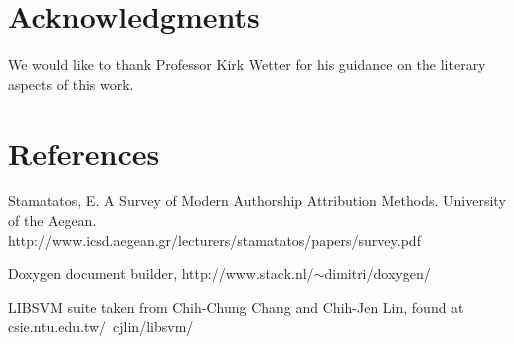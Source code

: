 \documentclass[11pt,letterpaper]{article}
\begin{document}
\section*{Acknowledgments}

We would like to thank Professor Kirk Wetter for his guidance on the literary aspects of this work. 

\section*{References}
Stamatatos, E. A Survey of Modern Authorship Attribution Methods. University of the Aegean. http://www.icsd.aegean.gr/lecturers/stamatatos/papers/survey.pdf

Doxygen document builder, http://www.stack.nl/$\sim$dimitri/doxygen/

LIBSVM suite taken from Chih-Chung Chang and Chih-Jen Lin, found at csie.ntu.edu.tw/~cjlin/libsvm/
\end{document}
